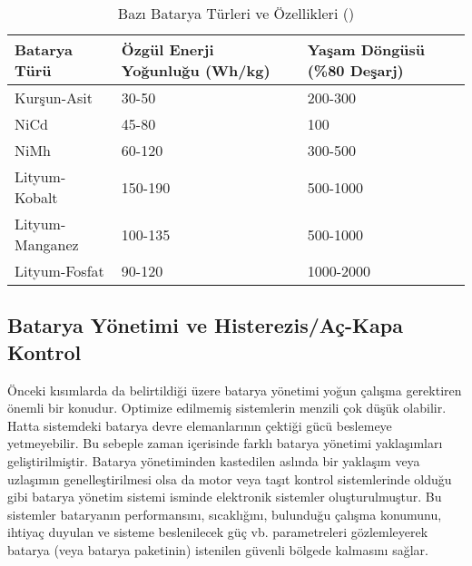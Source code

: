 \begin{table}[h]
    \centering
    \caption{Bazı Batarya Türleri ve Özellikleri (\cite{batturtabloref})}\label{tab:bataryaturleritablosu}
    \begin{tabular}{|l|l|l|}
    \hline
    \textbf{Batarya Türü} & \textbf{Özgül Enerji Yoğunluğu (Wh/kg)}  & \textbf{Yaşam Döngüsü (\%80 Deşarj)}         \\ \hline
    Kurşun-Asit           & 30-50                                    & 200-300                                      \\ \hline
    NiCd                  & 45-80                                    & 100                                          \\ \hline
    NiMh                  & 60-120                                   & 300-500                                      \\ \hline
    Lityum-Kobalt         & 150-190                                  & 500-1000                                     \\ \hline
    Lityum-Manganez       & 100-135                                  & 500-1000                                     \\ \hline
    Lityum-Fosfat         & 90-120                                   & 1000-2000                                    \\ \hline
    \end{tabular}
\end{table}

\subsection{Batarya Yönetimi ve Histerezis/Aç-Kapa Kontrol}
\label{bmssection}
Önceki kısımlarda da belirtildiği üzere batarya yönetimi yoğun çalışma gerektiren önemli bir konudur. Optimize edilmemiş sistemlerin menzili çok düşük olabilir. Hatta sistemdeki batarya devre elemanlarının çektiği gücü 
beslemeye yetmeyebilir. Bu sebeple zaman içerisinde farklı batarya yönetimi yaklaşımları geliştirilmiştir. Batarya yönetiminden kastedilen aslında bir yaklaşım veya uzlaşımın genelleştirilmesi olsa da 
motor veya taşıt kontrol sistemlerinde olduğu gibi batarya yönetim sistemi isminde elektronik sistemler oluşturulmuştur. Bu sistemler bataryanın performansını, sıcaklığını, bulunduğu çalışma konumunu, ihtiyaç duyulan ve sisteme beslenilecek güç vb. parametreleri 
gözlemleyerek batarya (veya batarya paketinin) istenilen güvenli bölgede kalmasını sağlar.

